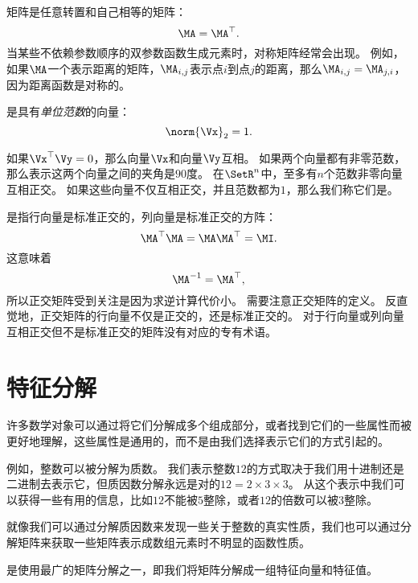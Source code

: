 
矩阵是任意转置和自己相等的矩阵：
\begin{equation}
    \MA=\MA^\top.
\end{equation}
当某些不依赖参数顺序的双参数函数生成元素时，对称矩阵经常会出现。
例如，如果$\MA$一个表示距离的矩阵，$\MA_{i,j}$表示点$i$到点$j$的距离，那么$\MA_{i,j}=\MA_{j,i}$，因为距离函数是对称的。


是具有\emph{单位范数}的向量：
\begin{equation}
\norm{\Vx}_2=1.
\end{equation}


如果$\Vx^\top \Vy = 0$，那么向量$\Vx$和向量$\Vy$互相。
如果两个向量都有非零范数，那么表示这两个向量之间的夹角是$90$度。
在$\SetR^n$中，至多有$n$个范数非零向量互相正交。
如果这些向量不仅互相正交，并且范数都为$1$，那么我们称它们是。


是指行向量是标准正交的，列向量是标准正交的方阵：
\begin{equation}
    \MA^\top\MA=\MA\MA^\top=\MI.
\end{equation}
这意味着 
\begin{equation}
    \MA^{-1}=\MA^\top,
\end{equation}
所以正交矩阵受到关注是因为求逆计算代价小。
需要注意正交矩阵的定义。
反直觉地，正交矩阵的行向量不仅是正交的，还是标准正交的。
对于行向量或列向量互相正交但不是标准正交的矩阵没有对应的专有术语。




\section{特征分解}
\label{sec:eigendecomposition}

许多数学对象可以通过将它们分解成多个组成部分，或者找到它们的一些属性而被更好地理解，这些属性是通用的，而不是由我们选择表示它们的方式引起的。


例如，整数可以被分解为质数。
我们表示整数$12$的方式取决于我们用十进制还是二进制去表示它，但质因数分解永远是对的$12=2\times 3\times 3$。
从这个表示中我们可以获得一些有用的信息，比如$12$不能被$5$整除，或者$12$的倍数可以被$3$整除。


就像我们可以通过分解质因数来发现一些关于整数的真实性质，我们也可以通过分解矩阵来获取一些矩阵表示成数组元素时不明显的函数性质。


是使用最广的矩阵分解之一，即我们将矩阵分解成一组特征向量和特征值。


